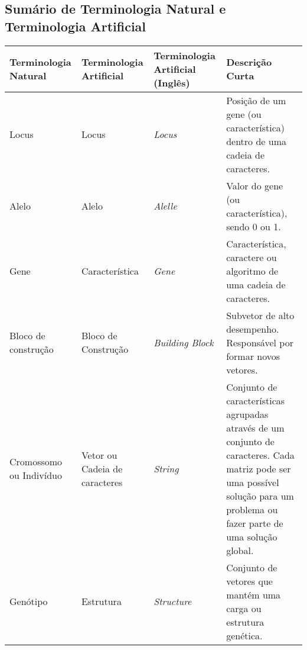 \documentclass[a4paper,12pt,openright,oneside]{book}
\begin{document}
\appendixpage
\begin{appendices}

\chapter{Sumário de Terminologia Natural e Terminologia Artificial}
\begin{table}[h!]
\centering
\begin{tabular}{ | >{\centering\arraybackslash}m{} | >{\centering\arraybackslash}m{} | >{\centering\arraybackslash}m{} | >{\centering\arraybackslash}m{} | } \hline
        Terminologia Natural               &   Terminologia Artificial            &   Terminologia Artificial (Inglês)   & Descrição Curta                                                                     \\ \hline
        Locus                              &   Locus                              &   \textit{Locus}                              & Posição de um gene (ou característica) dentro de uma cadeia de caracteres. \\ \hline
        Alelo                              &   Alelo                              &   \textit{Alelle}                             & Valor do gene (ou característica), sendo 0 ou 1.                           \\ \hline
        Gene                               &   Característica                     &   \textit{Gene}                               & Característica, caractere ou algoritmo de uma cadeia de caracteres.        \\ \hline
        Bloco de construção                &   Bloco de Construção                &   \textit{Building Block}                     & Subvetor de alto desempenho. Responsável por formar novos vetores.         \\ \hline
        Cromossomo ou Indivíduo            &   Vetor ou Cadeia de caracteres      &   \textit{String}                             & Conjunto de características agrupadas através de um conjunto de caracteres. Cada matriz pode ser uma possível solução para um problema ou fazer parte de uma solução global.                                                                                                                        \\ \hline
        Genótipo                           &   Estrutura                          &   \textit{Structure}                          & Conjunto de vetores que mantém uma carga ou estrutura genética.            \\ \hline

\end{tabular}
\end{table}
\end{appendices}
\end{document}
